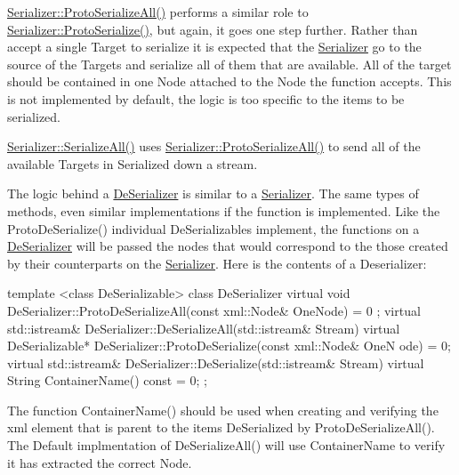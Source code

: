  \par
 \hyperlink{classMezzanine_1_1Serializer_a310e3fb563ccc12528ea9b8c25fcd7a8}{Serializer::ProtoSerializeAll()} performs a similar role to \hyperlink{classMezzanine_1_1Serializer_af756e6eba414a1dca624d452abf4bf63}{Serializer::ProtoSerialize()}, but again, it goes one step further. Rather than accept a single Target to serialize it is expected that the \hyperlink{classMezzanine_1_1Serializer}{Serializer} go to the source of the Targets and serialize all of them that are available. All of the target should be contained in one Node attached to the Node the function accepts. This is not implemented by default, the logic is too specific to the items to be serialized. \par
 \par
 \hyperlink{classMezzanine_1_1Serializer_aa178dfa519a2e73e84c0a2f35b2b8b5f}{Serializer::SerializeAll()} uses \hyperlink{classMezzanine_1_1Serializer_a310e3fb563ccc12528ea9b8c25fcd7a8}{Serializer::ProtoSerializeAll()} to send all of the available Targets in Serialized down a stream. \par
 \par
 The logic behind a \hyperlink{classMezzanine_1_1DeSerializer}{DeSerializer} is similar to a \hyperlink{classMezzanine_1_1Serializer}{Serializer}. The same types of methods, even similar implementations if the function is implemented. Like the ProtoDeSerialize() individual DeSerializables implement, the functions on a \hyperlink{classMezzanine_1_1DeSerializer}{DeSerializer} will be passed the nodes that would correspond to the those created by their counterparts on the \hyperlink{classMezzanine_1_1Serializer}{Serializer}. Here is the contents of a Deserializer: 
\begin{DoxyCode}
 template <class DeSerializable> class DeSerializer
 {
     virtual void DeSerializer::ProtoDeSerializeAll(const xml::Node& OneNode) = 0
      ;
     virtual std::istream& DeSerializer::DeSerializeAll(std::istream& Stream)
     virtual DeSerializable* DeSerializer::ProtoDeSerialize(const xml::Node& OneN
      ode) = 0;
     virtual std::istream& DeSerializer::DeSerialize(std::istream& Stream)
     virtual String ContainerName() const = 0;
 };
\end{DoxyCode}
 The function ContainerName() should be used when creating and verifying the xml element that is parent to the items DeSerialized by ProtoDeSerializeAll(). The Default implmentation of DeSerializeAll() will use ContainerName to verify it has extracted the correct Node. \par

